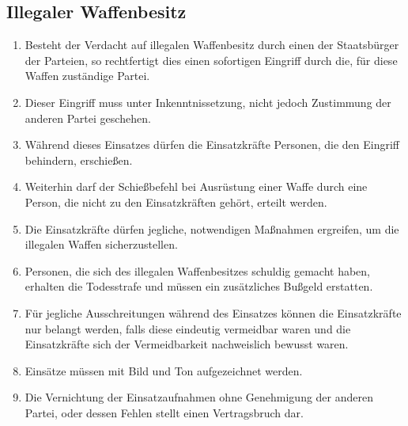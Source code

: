\documentclass{article}
\begin{document}
\subsection{Illegaler Waffenbesitz}
\begin{enumerate}[(1)]
    \item Besteht der Verdacht auf illegalen Waffenbesitz durch einen der Staatsbürger der Parteien, so rechtfertigt dies einen sofortigen Eingriff durch die, für diese Waffen zuständige Partei.
    \item Dieser Eingriff muss unter Inkenntnissetzung, nicht jedoch Zustimmung der anderen Partei geschehen.
    \item Während dieses Einsatzes dürfen die Einsatzkräfte Personen, die den Eingriff behindern, erschießen.
    \item Weiterhin darf der Schießbefehl bei Ausrüstung einer Waffe durch eine Person, die nicht zu den Einsatzkräften gehört, erteilt werden.
    \item Die Einsatzkräfte dürfen jegliche, notwendigen Maßnahmen ergreifen, um die illegalen Waffen sicherzustellen.
    \item Personen, die sich des illegalen Waffenbesitzes schuldig gemacht haben, erhalten die Todesstrafe und müssen ein zusätzliches Bußgeld erstatten.
    \item Für jegliche Ausschreitungen während des Einsatzes können die Einsatzkräfte nur belangt werden, falls diese eindeutig vermeidbar waren und die Einsatzkräfte sich der Vermeidbarkeit nachweislich bewusst waren.
    \item Einsätze müssen mit Bild und Ton aufgezeichnet werden.
    \item Die Vernichtung der Einsatzaufnahmen ohne Genehmigung der anderen Partei, oder dessen Fehlen stellt einen Vertragsbruch dar.
\end{enumerate}
\end{document}
